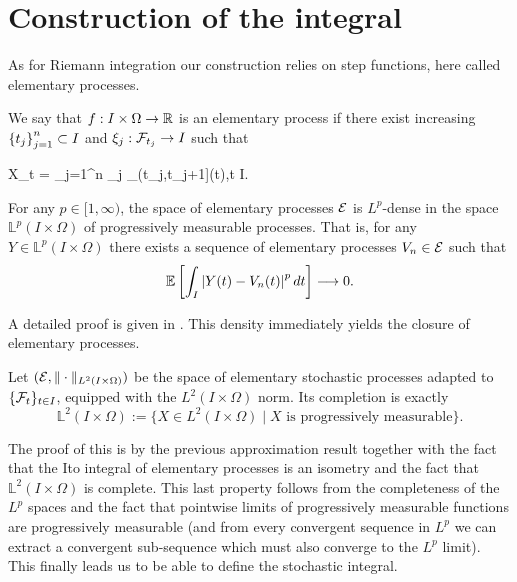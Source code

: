 \documentclass[
    a4paper,
    DIV=14,
    abstract=true,
    numbers=noenddot
]{scrartcl}
\begin{document}
\section{Construction of the integral}
As for Riemann integration our construction relies on step functions, here called elementary processes.
\begin{definition}
	We say that $f: I \times \Omega \to \mathbb{R}$ is an elementary process if there exist increasing $ \left\{t_j\right\}_{j=1}^n  \subset I$ and $\xi_j : \mathcal{F}_{t_j} \to I $ such that
\begin{aligneq*}
	X_t = \sum_{j=1}^n \xi_{j} _{(t_j,t_{j+1}]}(t),\quad \forall t \in I.
\end{aligneq*}
\end{definition}
\begin{lemma}
	For any $p \in[1, \infty)$, the space of elementary processes $\mathcal{E}$ is $L^{p}$-dense in the space $\mathbb{L}^{p}(I\times\Omega)$ of progressively measurable processes. That is, for any $Y \in \mathbb{L}^{p}(I\times\Omega)$ there exists a sequence of elementary processes $V_{n} \in \mathcal{E}$ such that
	$$
		\mathbb{E}\left[\int_{I}\left|Y(t)-V_{n}(t)\right|^{p} dt\right] \longrightarrow 0.
	$$
\end{lemma}
A detailed proof is given in \citet[Chapter 2]{Lalley2013NOTESOT}. This density immediately yields the closure of elementary processes.
\begin{theorem}
	Let $(\mathcal{E},\|\cdot\|_{L^2(I\times\Omega)})$ be the space of elementary stochastic processes adapted to $\{\mathcal{F}_t\}_{t\in I}$, equipped with the $L^2(I\times\Omega)$ norm. Its completion is exactly
	\begin{equation*}
		\mathbb{L}^2(I\times\Omega) := \{X\in L^2(I\times\Omega) \mid X \text{ is progressively measurable}\}.
	\end{equation*}
\end{theorem}
The proof of this is by the previous approximation result together with the fact that the Ito integral of elementary processes is an isometry and the fact that $\mathbb{L}^2(I\times\Omega)$ is complete. This last property follows from the completeness of the $L^p$ spaces and the fact that pointwise limits of progressively measurable functions are progressively measurable (and from every convergent sequence in $L^p$ we can extract a convergent sub-sequence which must also converge to the $L^p$ limit).
This finally leads us to be able to define the stochastic integral.
\end{document}
